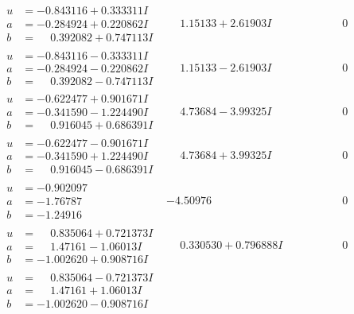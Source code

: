 \documentclass[1p]{elsarticle_modified}
\theoremstyle{definition}
\begin{document}
$$\begin{array}{c|c|c}
\begin{aligned}
u &= -0.843116 + 0.333311 I \\
a &= -0.284924 + 0.220862 I \\
b &= \phantom{-}0.392082 + 0.747113 I\end{aligned}
 & \phantom{-}1.15133 + 2.61903 I & \phantom{-0.000000 } 0 \\ \hline\begin{aligned}
u &= -0.843116 - 0.333311 I \\
a &= -0.284924 - 0.220862 I \\
b &= \phantom{-}0.392082 - 0.747113 I\end{aligned}
 & \phantom{-}1.15133 - 2.61903 I & \phantom{-0.000000 } 0 \\ \hline\begin{aligned}
u &= -0.622477 + 0.901671 I \\
a &= -0.341590 - 1.224490 I \\
b &= \phantom{-}0.916045 + 0.686391 I\end{aligned}
 & \phantom{-}4.73684 - 3.99325 I & \phantom{-0.000000 } 0 \\ \hline\begin{aligned}
u &= -0.622477 - 0.901671 I \\
a &= -0.341590 + 1.224490 I \\
b &= \phantom{-}0.916045 - 0.686391 I\end{aligned}
 & \phantom{-}4.73684 + 3.99325 I & \phantom{-0.000000 } 0 \\ \hline\begin{aligned}
u &= -0.902097\phantom{ +0.000000I} \\
a &= -1.76787\phantom{ +0.000000I} \\
b &= -1.24916\phantom{ +0.000000I}\end{aligned}
 & -4.50976\phantom{ +0.000000I} & \phantom{-0.000000 } 0 \\ \hline\begin{aligned}
u &= \phantom{-}0.835064 + 0.721373 I \\
a &= \phantom{-}1.47161 - 1.06013 I \\
b &= -1.002620 + 0.908716 I\end{aligned}
 & \phantom{-}0.330530 + 0.796888 I & \phantom{-0.000000 } 0 \\ \hline\begin{aligned}
u &= \phantom{-}0.835064 - 0.721373 I \\
a &= \phantom{-}1.47161 + 1.06013 I \\
b &= -1.002620 - 0.908716 I\end{aligned}

\end{array}$$
\end{document}
